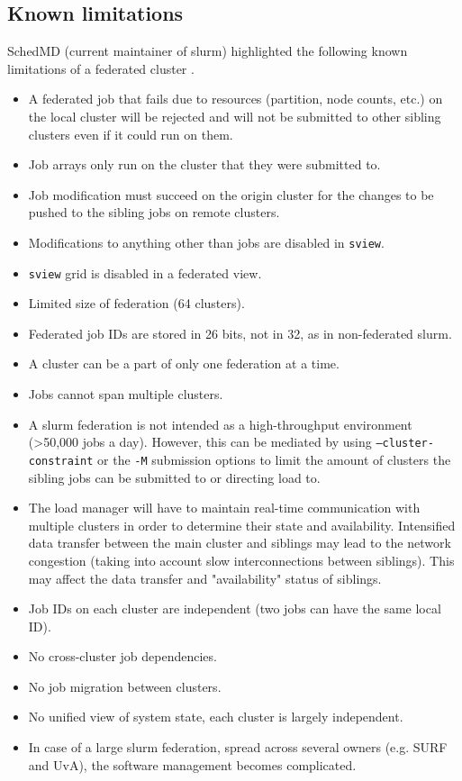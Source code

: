 \documentclass[conference]{IEEEtran}
\begin{document}
\subsection{Known limitations}
\label{sec-limitations}
SchedMD (current maintainer of \gls{slurm}) highlighted the following known limitations of a federated cluster \cite{slurm-federated-guide, slurm-federated-cluster-support}.

\begin{itemize}
    \item A federated job that fails due to resources (partition, node counts, etc.) on the local cluster will be rejected and will not be submitted to other sibling clusters even if it could run on them.
    \item Job arrays only run on the cluster that they were submitted to.
    \item Job modification must succeed on the origin cluster for the changes to be pushed to the sibling jobs on remote clusters.
    \item Modifications to anything other than jobs are disabled in \texttt{sview}.
    \item \texttt{sview} grid is disabled in a federated view.
    \item Limited size of federation (64 clusters).
    \item Federated job IDs are stored in 26 bits, not in 32, as in non-federated \gls{slurm}.
    \item A cluster can be a part of only one federation at a time.
    \item Jobs cannot span multiple clusters.
    \item A \gls{slurm} federation is not intended as a high-throughput environment (\textgreater 50,000 jobs a day). However, this can be mediated by using \texttt{--cluster-constraint} or the \texttt{-M} submission options to limit the amount of clusters the sibling jobs can be submitted to or directing load to.
    \item The load manager will have to maintain real-time communication with multiple clusters in order to determine their state and availability. Intensified data transfer between the main cluster and siblings may lead to the network congestion (taking into account slow interconnections between siblings). This may affect the data transfer and "availability" status of siblings.
    \item Job IDs on each cluster are independent (two jobs can have the same local ID).
    \item No cross-cluster job dependencies.
    \item No job migration between clusters.
    \item No unified view of system state, each cluster is largely independent.
    \item In case of a large \gls{slurm} federation, spread across several owners (e.g. SURF and UvA), the software management becomes complicated.
\end{itemize}
\end{document}
